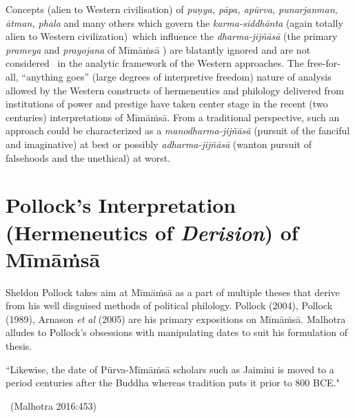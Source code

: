 Concepts (alien to Western civilisation) of \textit{puṇya, pāpa, apūrva, punarjanman, ātman, phala} and many others which govern the \textit{karma-siddhānta} (again totally alien to Western civilization) which influence the \textit{dharma-jijñāsā} (the primary \textit{prameya} and \textit{prayojana} of Mīmāṁsā ) are blatantly ignored and are not considered  in the analytic framework of the Western approaches. The free-for-all, “anything goes” (large degrees of interpretive freedom) nature of analysis allowed by the Western constructs of hermeneutics and philology delivered from institutions of power and prestige have taken center stage in the recent (two centuries) interpretations of Mīmāṁsā. From a traditional perspective, such an approach could be characterized as a \textit{manodharma-jijñāsā} (pursuit of the fanciful and imaginative) at best or possibly \textit{adharma-jijñāsā} (wanton pursuit of falsehoods and the unethical) at worst.


\section*{Pollock’s Interpretation (Hermeneutics of \textit{Derision}) of Mīmāṁsā}

Sheldon Pollock takes aim at Mīmāṁsā as a part of multiple theses that derive from his well disguised methods of political philology. Pollock (2004), Pollock (1989), Arnason \textit{et al} (2005) are his primary expositions on Mīmāṁsā. Malhotra alludes to Pollock’s obsessions with manipulating dates to suit his formulation of thesis.

\vskip 3pt

\begin{myquote}
“Likewise, the date of Pūrva-Mīmāṁsā scholars such as Jaimini is moved to a period centuries after the Buddha whereas tradition puts it prior to 800 BCE."

~\hfill (Malhotra 2016:453)
\end{myquote}

